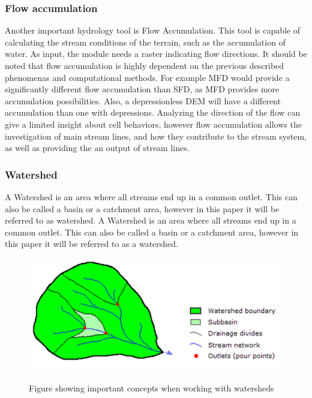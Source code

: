 \subsubsection{Flow accumulation}
Another important hydrology tool is Flow Accumulation. This tool is capable of calculating the stream conditions of the terrain, such as the accumulation of water. As input, the module needs a raster indicating flow directions. It should be noted that flow accumulation is highly dependent on the previous described phenomenas and computational methods. For example MFD would provide a significantly different flow accumulation than SFD, as MFD provides more accumulation possibilities. Also, a depressionless DEM will have a different accumulation than one with depressions. Analyzing the direction of the flow can give a limited insight about cell behaviors, however flow accumulation allows the investigation of main stream lines, and how they contribute to the stream system, as well as providing the an output of stream lines.

\subsubsection{Watershed}
A Watershed is an area where all streams end up in a common outlet. This can also be called a basin or a catchment area, however in this paper it will be referred to as watershed.
A Watershed is an area where all streams end up in a common outlet. This can also be called a basin or a catchment area, however in this paper it will be referred to as a watershed.\\


\begin{figure}[h]
\centering
	{\includegraphics[width=\linewidth]{gfx/Watershed.png}}
\caption{Figure showing important concepts when working with watersheds}
\end{figure}


